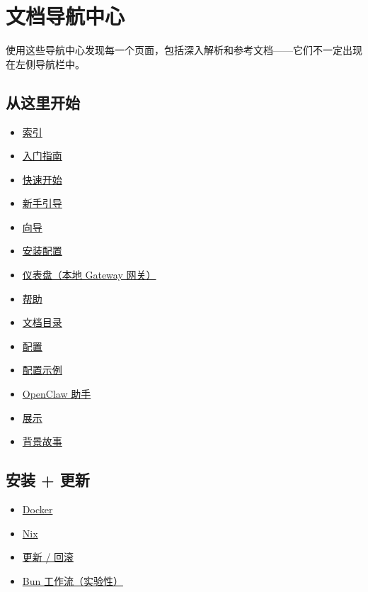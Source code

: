 \clearpage

\section{文档导航中心}


使用这些导航中心发现每一个页面，包括深入解析和参考文档——它们不一定出现在左侧导航栏中。

\subsection{从这里开始}


\begin{itemize}
  \item \href{/}{索引}
  \item \href{/start/getting-started}{入门指南}
  \item \href{/start/quickstart}{快速开始}
  \item \href{/start/onboarding}{新手引导}
  \item \href{/start/wizard}{向导}
  \item \href{/start/setup}{安装配置}
  \item \href{http://127.0.0.1:18789/}{仪表盘（本地 Gateway 网关）}
  \item \href{/help}{帮助}
  \item \href{/start/docs-directory}{文档目录}
  \item \href{/gateway/configuration}{配置}
  \item \href{/gateway/configuration-examples}{配置示例}
  \item \href{/start/openclaw}{OpenClaw 助手}
  \item \href{/start/showcase}{展示}
  \item \href{/start/lore}{背景故事}
\end{itemize}


\subsection{安装 + 更新}


\begin{itemize}
  \item \href{/install/docker}{Docker}
  \item \href{/install/nix}{Nix}
  \item \href{/install/updating}{更新 / 回滚}
  \item \href{/install/bun}{Bun 工作流（实验性）}
\end{itemize}


